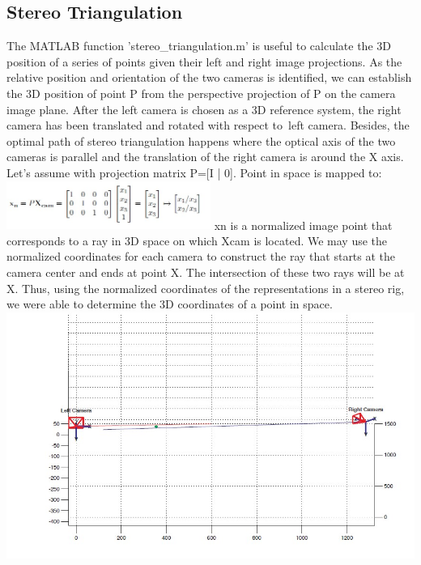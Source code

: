 \documentclass[a4paper, 12pt]{report}
\begin{document}
\subsection{Stereo Triangulation}
The MATLAB function 'stereo\_triangulation.m' is useful to calculate the 3D position of a series of points given their left and right image projections. As the relative position and orientation of the two cameras is identified, we can establish the 3D position of point P from the perspective projection of P on the camera image plane. After the left camera is chosen as a 3D reference system, the right camera has been translated and rotated with respect to left camera. Besides, the optimal path of stereo triangulation happens where the optical axis of the two cameras is parallel and the translation of the right camera is around the X axis. \newline 
Let's assume with projection matrix P=[I | 0]. Point in space is mapped to: \newline 
\includegraphics[width=0.5\textwidth]{resources/image/36.jpg} \newline 
xn is a normalized image point that corresponds to a ray in 3D space on which Xcam is located. 
We may use the normalized coordinates for each camera to construct the ray that starts at the camera center and ends at point X. The intersection of these two rays will be at X. Thus, using the normalized coordinates of the representations in a stereo rig, we were able to determine the 3D coordinates of a point in space.
\newline 
\includegraphics[width=1.0\textwidth]{resources/image/37.jpg} \newline 
\end{document}
